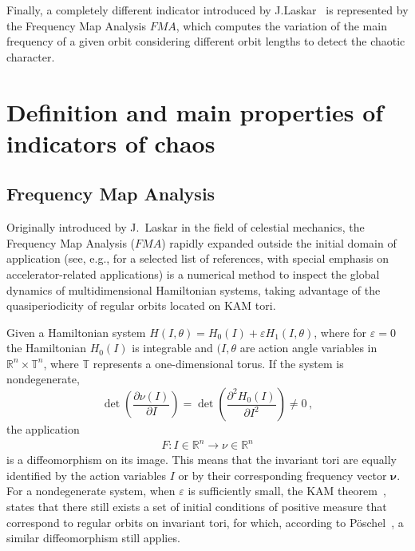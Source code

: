 Finally, a completely different indicator introduced by J.Laskar~\cite{Laskar1999,Laskar2003} is represented by the Frequency Map Analysis $FMA$, which computes the variation of the main frequency of a given orbit considering different orbit lengths to detect the chaotic character. 
%
\section{Definition and main properties of indicators of chaos} \label{sec:dyn:review}
%
\subsection{Frequency Map Analysis\label{subsec:dyn:fma}}
%
Originally introduced by J.~Laskar in the field of celestial mechanics, the Frequency Map Analysis ($FMA$) rapidly expanded outside the initial domain of application (see, e.g., \cite{laskar1995frequency,lega1996numerical,papaphilippou1996frequency,papaphilippou1998global,Laskar1999, Papaphilippou1999, laskar2000application,PhysRevSTAB.4.124201,1288929,Papaphilippou:PAC03-RPPG007,Laskar2003,PhysRevSTAB.6.114801,shun2009nonlinear,PhysRevSTAB.14.014001,papaphilippou2014,tydecks:ipac18-mopmf057,PhysRevAccelBeams.22.071002} for a selected list of references, with special emphasis on accelerator-related applications) is a numerical method to inspect the global dynamics of multidimensional Hamiltonian systems, taking advantage of the quasiperiodicity of regular orbits located on KAM tori.

Given a Hamiltonian system $H(I,\theta) = H_0 (I) + \varepsilon H_1 (I, \theta)$, where for $\varepsilon=0$ the Hamiltonian $H_0(I)$ is integrable and $(I, \theta$ are action angle variables in $\mathbb{R}^n \times \mathbb{T}^n$, where $\mathbb{T}$ represents a one-dimensional torus. %
If the system is nondegenerate,
\begin{equation}
    \operatorname{det}\left(\frac{\partial \nu(I)}{\partial I}\right)=\operatorname{det}\left(\frac{\partial^2 H_0(I)}{\partial I^2}\right) \neq 0 \,,
\end{equation}
the application
\begin{equation}
    \begin{array}{r}
    F: I\in \mathbb{R}^{n} \longrightarrow \nu\in \mathbb{R}^n 
    \end{array}
\end{equation}
is a diffeomorphism on its image. This means that the invariant tori are equally identified by the action variables $I$ or by their corresponding frequency vector $\mathbf{\nu}$. For a nondegenerate system, when $\varepsilon$ is sufficiently small, the KAM theorem~\cite{KAM1,KAM2,KAM3}, states that there still exists a set of initial conditions of positive measure that correspond to regular orbits on invariant tori, for which, according to Pöschel~\cite{Poschel1982}, a similar diffeomorphism still applies.

